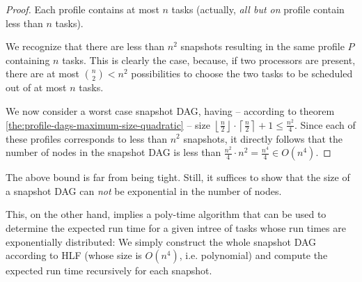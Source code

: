 \begin{proof}
  Each profile contains at most $n$ tasks (actually, \emph{all but on} profile contain less than $n$ tasks).

  We recognize that there are less than $n^2$ snapshots resulting in the same profile $P$ containing $n$ tasks. This is clearly the case, because, if two processors are present, there are at most $\binom{n}{2} < n^2$ possibilities to choose the two tasks to be scheduled out of at most $n$ tasks.

  \newcommand{\ceiln}{\left\lceil \frac{n}{2} \right\rceil}
  \newcommand{\floorn}{\left\lfloor \frac{n}{2} \right\rfloor}
  We now consider a worst case snapshot DAG, having -- according to theorem \ref{the:profile-dags-maximum-size-quadratic} -- size $\floorn \cdot \ceiln +1\leq \frac{n^2}{4}$. Since each of these profiles corresponds to less than $n^2$ snapshots, it directly follows that the number of nodes in the snapshot DAG is less than $\frac{n^2}{4}\cdot n^2=\frac{n^4}{4}\in O(n^4)$.
\end{proof}

The above bound is far from being tight. Still, it suffices to show that the size of a snapshot DAG can \emph{not} be exponential in the number of nodes.

This, on the other hand, implies a poly-time algorithm that can be used to determine the expected run time for a given intree of tasks whose run times are exponentially distributed: We simply construct the whole snapshot DAG according to HLF (whose size is $O(n^4)$, i.e. polynomial) and compute the expected run time recursively for each snapshot.

